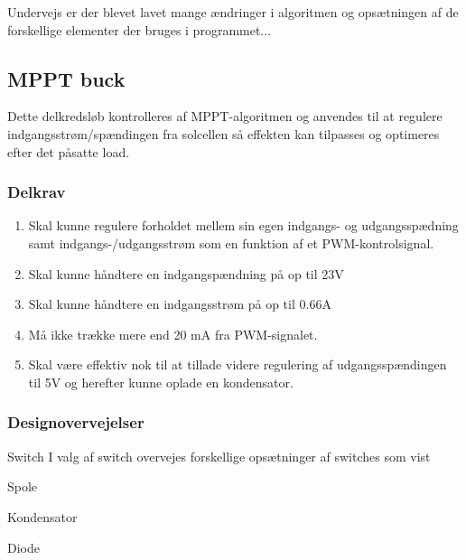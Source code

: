 \documentclass[../main.tex]{subfiles}
\begin{document}
    Undervejs er der blevet lavet mange ændringer i algoritmen og opsætningen af de forskellige elementer der bruges i programmet...


    \subsection{MPPT buck}
        Dette delkredsløb kontrolleres af MPPT-algoritmen og anvendes til at regulere indgangsstrøm/spændingen fra solcellen så effekten kan tilpasses og optimeres efter det påsatte load.
        
        \subsubsection{Delkrav}

            \begin{enumerate}
                \item Skal kunne regulere forholdet mellem sin egen indgangs- og udgangsspædning samt indgangs-/udgangsstrøm som en funktion af et PWM-kontrolsignal.
                \item Skal kunne håndtere en indgangspændning på op til 23V
                \item Skal kunne håndtere en indgangsstrøm på op til 0.66A
                \item Må ikke trække mere end 20 mA fra PWM-signalet.
                \item Skal være effektiv nok til at tillade videre regulering af udgangsspændingen til 5V og herefter kunne oplade en kondensator.
            \end{enumerate}
            
        \subsubsection{Designovervejelser}
            
            Switch
            I valg af switch overvejes forskellige opsætninger af switches som vist 
            
            
            Spole
            
            
            
            Kondensator
            
            
            
            Diode
            
            
            
\end{document}
